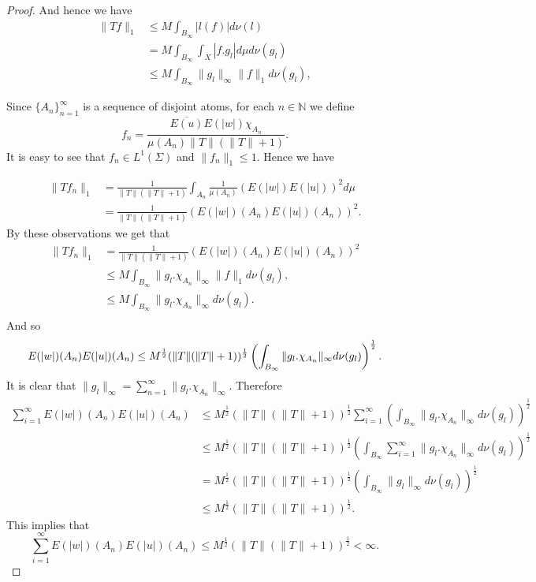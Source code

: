 \documentclass{amsart}
\theoremstyle{definition}\newtheorem{defn}[thm]{Definition}
\theoremstyle{remark}
\numberwithin{equation}{section}
\begin{document}
\begin{proof}
And hence we have
\begin{align*}
\|Tf\|_1&\leq M\int_{B_{\infty}}|l(f)|d\nu(l)\\
&=M\int_{B_{\infty}}\int_X|f.g_l| d\mu d\nu(g_l)\\
&\leq M\int_{B_{\infty}}\|g_l\|_{\infty}\|f\|_1d\nu(g_l),
\end{align*}
 
Since $\{A_n\}^{\infty}_{n=1}$ is a sequence of disjoint atoms, for each $n\in \mathbb{N}$ we define
$$f_{n}=\frac{\overline{E(u)}E(|w|)\chi_{A_{n}}}{\mu(A_{n})\|T\|(\|T\|+1)}.$$
It is easy to see that $f_n\in L^1(\Sigma)$ and $\|f_n\|_1\leq 1$. Hence we have

\begin{align*}
\|Tf_n\|_1&=\frac{1}{\|T\|(\|T\|+1)}\int_{A_n}\frac{1}{\mu(A_{n})}\left(E(|w|)E(|u|)\right)^{2}d\mu\\
&=\frac{1}{\|T\|(\|T\|+1)}\left(E(|w|)(A_n)E(|u|)(A_n)\right)^{2}.
\end{align*}
By these observations we get that
\begin{align*}
\|Tf_n\|_1&=\frac{1}{\|T\|(\|T\|+1)}\left(E(|w|)(A_n)E(|u|)(A_n)\right)^{2}\\
&\leq M\int_{B_{\infty}}\|g_l.\chi_{A_n}\|_{\infty}\|f\|_1d\nu(g_l),\\
&\leq  M\int_{B_{\infty}}\|g_l.\chi_{A_n}\|_{\infty}d\nu(g_l).\\
\end{align*}
And so
$$E(|w|)(A_n)E(|u|)(A_n)\leq  M^{\frac{1}{2}}(\|T\|(\|T\|+1))^{\frac{1}{2}}\left(\int_{B_{\infty}}\|g_l.\chi_{A_n}\|_{\infty}d\nu(g_l)\right)^{\frac{1}{2}}.\\$$
It is clear that $\|g_l\|_{\infty}=\sum^{\infty}_{n=1}\|g_l.\chi_{A_n}\|_{\infty}$. Therefore
\begin{align*}
\sum^{\infty}_{i=1}E(|w|)(A_n)E(|u|)(A_n)&\leq M^{\frac{1}{2}}(\|T\|(\|T\|+1))^{\frac{1}{2}}\sum^{\infty}_{i=1}\left(\int_{B_{\infty}}\|g_l.\chi_{A_n}\|_{\infty}d\nu(g_l)\right)^{\frac{1}{2}}\\
&\leq M^{\frac{1}{2}}(\|T\|(\|T\|+1))^{\frac{1}{2}}\left(\int_{B_{\infty}}\sum^{\infty}_{i=1}\|g_l.\chi_{A_n}\|_{\infty}d\nu(g_l)\right)^{\frac{1}{2}}\\
&=M^{\frac{1}{2}}(\|T\|(\|T\|+1))^{\frac{1}{2}}\left(\int_{B_{\infty}}\|g_l\|_{\infty}d\nu(g_l)\right)^{\frac{1}{2}}\\
&\leq M^{\frac{1}{2}}(\|T\|(\|T\|+1))^{\frac{1}{2}}.
\end{align*}
This implies that 
$$\sum^{\infty}_{i=1}E(|w|)(A_n)E(|u|)(A_n)\leq M^{\frac{1}{2}}(\|T\|(\|T\|+1))^{\frac{1}{2}}<\infty.$$
\end{proof}
\end{document}
